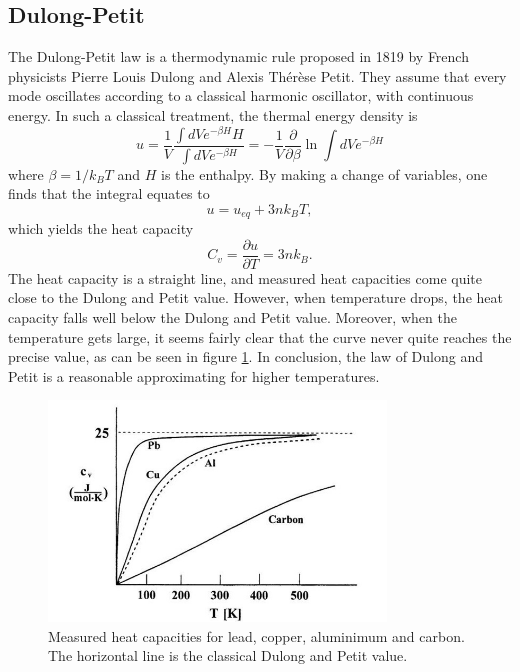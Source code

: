 \documentclass[11pt]{amsart}
\begin{document}
\subsection{Dulong-Petit}
The Dulong-Petit law is a thermodynamic rule proposed in 1819 by French physicists Pierre Louis Dulong and Alexis Thérèse Petit. They assume that every mode oscillates according to a classical harmonic oscillator, with continuous energy. In such a classical treatment, the thermal energy density is
\begin{equation}
u = \frac{1}{V}\frac{\int dV e^{-\beta H}H}{\int dV e^{-\beta H}} = -\frac{1}{V}\frac{\partial}{\partial \beta}\ln \int dV e^{-\beta H}
\end{equation}
where $\beta = 1/k_BT$ and $H$ is the enthalpy. By making a change of variables, one finds that the integral equates to
\begin{equation}
u = u_{eq} + 3nk_BT,
\end{equation}
which yields the heat capacity
\begin{equation}
C_v = \frac{\partial u}{\partial T} = 3nk_B.
\end{equation}
The heat capacity is a straight line, and measured heat capacities come quite close to the Dulong and Petit value. However, when temperature drops, the heat capacity falls well below the Dulong and Petit value. Moreover, when the temperature gets large, it seems fairly clear that the curve never quite reaches the precise value, as can be seen in figure 		\ref{fig:dulongpetit}. In conclusion, the law of Dulong and Petit is a reasonable approximating for higher temperatures.

\begin{figure}
\centering
	\includegraphics[width = 0.8\textwidth]{dulong_petit.jpg}
	\caption{Measured heat capacities for lead, copper, aluminimum and carbon. The horizontal line is the classical Dulong and Petit value.}
	\label{fig:dulongpetit}
\end{figure}
\end{document}
